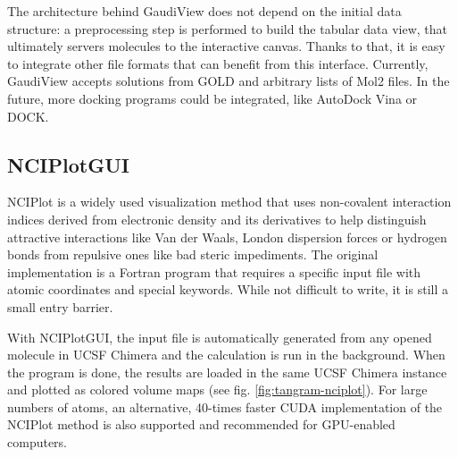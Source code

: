 The architecture behind GaudiView does not depend on the initial data structure: a preprocessing step is performed to build the tabular data view, that ultimately servers molecules to the interactive canvas. Thanks to that, it is easy to integrate other file formats that can benefit from this interface. Currently, GaudiView accepts solutions from GOLD and arbitrary lists of Mol2 files. In the future, more docking programs could be integrated, like AutoDock Vina or DOCK.

\subsection{NCIPlotGUI}
NCIPlot is a widely used visualization method\cite{nciplot} that uses non-covalent interaction indices derived from electronic density and its derivatives to help distinguish attractive interactions like Van der Waals, London dispersion forces or hydrogen bonds from repulsive ones like bad steric impediments. The original implementation is a Fortran program that requires a specific input file with atomic coordinates and special keywords. While not difficult to write, it is still a small entry barrier.

With NCIPlotGUI, the input file is automatically generated from any opened molecule in UCSF Chimera and the calculation is run in the background. When the program is done, the results are loaded in the same UCSF Chimera instance and plotted as colored volume maps (see fig. \ref{fig:tangram-nciplot}). For large numbers of atoms, an alternative, 40-times faster CUDA implementation of the NCIPlot method\cite{nciplotcuda} is also supported and recommended for GPU-enabled computers.



